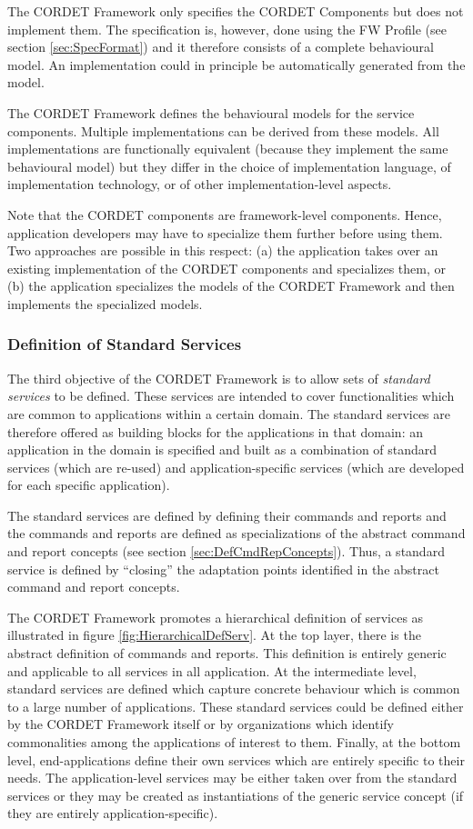 \documentclass[a4paper,10pt]{article}
\begin{document}
The CORDET Framework only specifies the CORDET Components but does not implement them. 
The specification is, however, done using the FW Profile (see section \ref{sec:SpecFormat}) and it therefore consists of a complete behavioural model. 
An implementation could in principle be automatically generated from the model. 

The CORDET Framework defines the behavioural models for the service components. 
Multiple implementations can be derived from these models. 
All implementations are functionally equivalent (because they implement the same behavioural model) but they differ in the choice of implementation language, of implementation technology, or of other implementation-level aspects. 

Note that the CORDET components are framework-level components. 
Hence, application developers may have to specialize them further before using them. 
Two approaches are possible in this respect: (a) the application takes over an existing implementation of the CORDET components and specializes them, or (b) the application specializes the models of the CORDET Framework and then implements the specialized models.

\subsubsection{Definition of Standard Services}\label{sec:StdServ}
The third objective of the CORDET Framework is to allow sets of \textit{standard services} to be defined. 
These services are intended to cover functionalities which are common to applications within a certain domain. 
The standard services are therefore offered as building blocks for the applications in that domain: 
an application in the domain is specified and built as a combination of standard services (which are re-used) and application-specific services (which are developed for each specific application).

The standard services are defined by defining their commands and reports and the commands and reports are defined as specializations of the abstract command and report concepts (see section \ref{sec:DefCmdRepConcepts}). 
Thus, a standard service is defined by “closing” the adaptation points identified in the abstract command and report concepts.

The CORDET Framework promotes a hierarchical definition of services as illustrated in figure \ref{fig:HierarchicalDefServ}. 
At the top layer, there is the abstract definition of commands and reports. 
This definition is entirely generic and applicable to all services in all application. 
At the intermediate level, standard services are defined which capture concrete behaviour which is common to a large number of applications. 
These standard services could be defined either by the CORDET Framework itself or by organizations which identify commonalities among the applications of interest to them. 
Finally, at the bottom level, end-applications define their own services which are entirely specific to their needs. 
The application-level services may be either taken over from the standard services or they may be created as instantiations of the generic service concept (if they are entirely application-specific).
\end{document}

